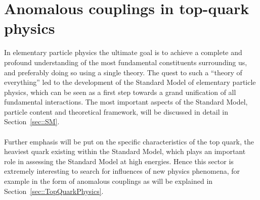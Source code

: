 \chapter{Anomalous couplings in top-quark physics} \label{chp::SM}


In elementary particle physics the ultimate goal is to achieve a complete and profound understanding of the most fundamental constituents surrounding us, and preferably doing so using a single theory.
The quest to such a ``theory of everything'' led to the development of the Standard Model of elementary particle physics, which can be seen as a first step towards a grand unification of all fundamental interactions. %
The most important aspects of the Standard Model, particle content and theoretical framework, will be discussed in detail in Section~\ref{sec::SM}.
\\
\\
Further emphasis will be put on the specific characteristics of the top quark, the heaviest quark existing within the Standard Model, which plays an important role in assessing the Standard Model at high energies. 
Hence this sector is extremely interesting to search for influences of new physics phenomena, for example in the form of anomalous couplings as will be explained in Section~\ref{sec::TopQuarkPhysics}.

